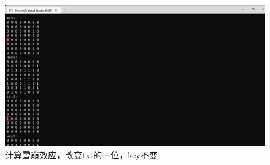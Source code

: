 \begin{figure}[thbp!]
	\centering
	\includegraphics[height=10 CM]{figure/006}
	\caption{计算雪崩效应，改变txt的一位，key不变}
	\label{fig:计算雪崩效应，改变txt的一位，key不变}
\end{figure}
